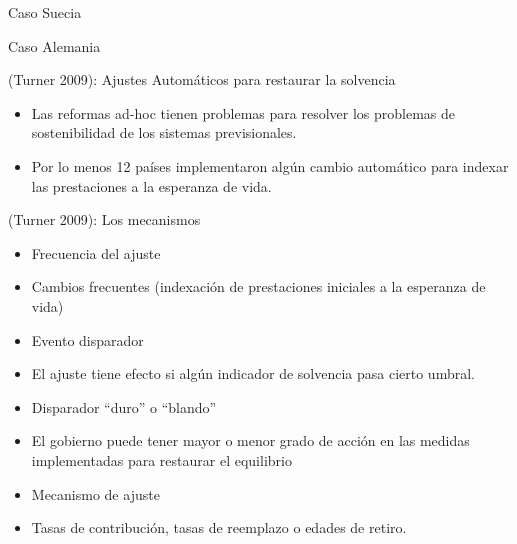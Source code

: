 \documentclass[ignorenonframetext,]{beamer}
\providecommand{\tightlist}{%
  \setlength{\itemsep}{0pt}\setlength{\parskip}{0pt}}
\begin{document}
\begin{frame}{Caso Suecia}

\end{frame}

\begin{frame}{Caso Alemania}

\end{frame}

\begin{frame}{(Turner 2009): Ajustes Automáticos para restaurar la
solvencia}

\begin{itemize}
\tightlist
\item
  Las reformas ad-hoc tienen problemas para resolver los problemas de
  sostenibilidad de los sistemas previsionales.
\item
  Por lo menos 12 países implementaron algún cambio automático para
  indexar las prestaciones a la esperanza de vida.
\end{itemize}

\end{frame}

\begin{frame}{(Turner 2009): Los mecanismos}

\begin{itemize}
\tightlist
\item
  Frecuencia del ajuste
\item
  Cambios frecuentes (indexación de prestaciones iniciales a la
  esperanza de vida)
\item
  Evento disparador
\item
  El ajuste tiene efecto si algún indicador de solvencia pasa cierto
  umbral.
\item
  Disparador ``duro'' o ``blando''
\item
  El gobierno puede tener mayor o menor grado de acción en las medidas
  implementadas para restaurar el equilibrio
\item
  Mecanismo de ajuste
\item
  Tasas de contribución, tasas de reemplazo o edades de retiro.
\end{itemize}

\end{frame}
\end{document}
